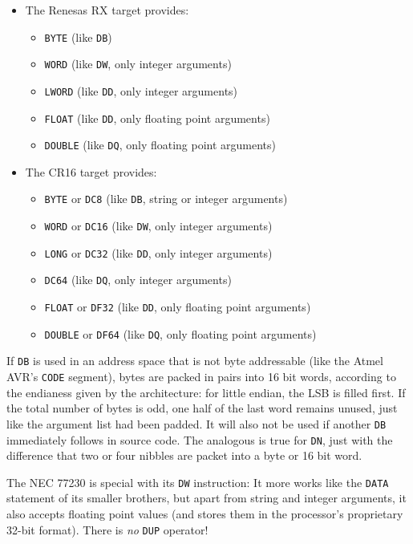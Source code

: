 \documentclass[12pt,twoside]{report}
\makeatletter
\newcommand{\tty}[1]{{\tt #1}}
\newcommand{\ttindex}[1]{\index{#1@{\tt #1}}}
\makeatother
\begin{document}
\begin{itemize}
{\begin{itemize}
      \item{\tty{DOUBLE} (like \tty{DQ}, only floating point arguments)}
      \end{itemize}}
\ttindex{LWORD}\ttindex{QUAD}
\item{The Renesas RX target provides:
      \begin{itemize}
      \item{\tty{BYTE} (like \tty{DB})}
      \item{\tty{WORD} (like \tty{DW}, only integer arguments)}
      \item{\tty{LWORD} (like \tty{DD}, only integer arguments)}
      \item{\tty{FLOAT} (like \tty{DD}, only floating point arguments)}
      \item{\tty{DOUBLE} (like \tty{DQ}, only floating point arguments)}
      \end{itemize}}
\item{The CR16 target provides:
      \begin{itemize}
      \item{\tty{BYTE} or \tty{DC8} (like \tty{DB}, string or integer arguments)}
      \item{\tty{WORD} or \tty{DC16} (like \tty{DW}, only integer arguments)}
      \item{\tty{LONG} or \tty{DC32} (like \tty{DD}, only integer arguments)}
      \item{\tty{DC64} (like \tty{DQ}, only integer arguments)}
      \item{\tty{FLOAT} or \tty{DF32} (like \tty{DD}, only floating point arguments)}
      \item{\tty{DOUBLE} or \tty{DF64} (like \tty{DQ}, only floating point arguments)}
      \end{itemize}}
\end{itemize}

If \tty{DB} is used in an address space that is not byte addressable (like
the Atmel AVR's \tty{CODE} segment), bytes are packed in pairs into 16 bit
words, according to the endianess given by the architecture: for little
endian, the LSB is filled first.  If the total number of bytes is odd, one
half of the last word remains unused, just like the argument list had been
padded.  It will also not be used if another \tty{DB} immediately follows
in source code.  The analogous is true for \tty{DN}, just with the difference
that two or four nibbles are packet into a byte or 16 bit word.

The NEC 77230 is special with its \tty{DW} instruction: It more works like
the \tty{DATA} statement of its smaller brothers, but apart from string
and integer arguments, it also accepts floating point values (and stores
them in the processor's proprietary 32-bit format). There is {\em no}
\tty{DUP} operator!
\end{document}
